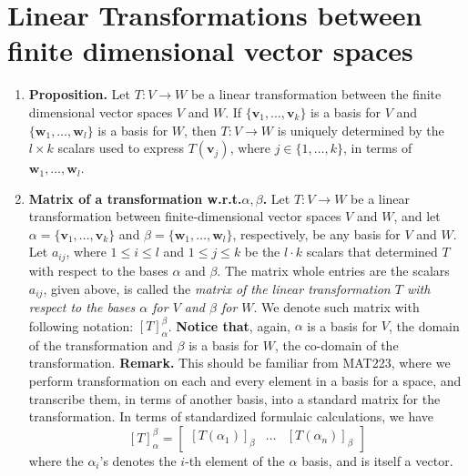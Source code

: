 \documentclass[oneside, 12pt]{book}
\newcommand{\settag}[1]{\renewcommand{\theenumi}{#1}}
\newcommand{\tbf}[1]{\textbf{#1}}
\newcommand{\tit}[1]{\textit{#1}}
\begin{document}
\section{Linear Transformations between finite dimensional vector spaces}
    \begin{enumerate}
        \settag{2.2.1}
        \item \tbf{Proposition.} Let $T:V\xrightarrow{}W$ be a linear transformation between the finite dimensional vector spaces $V$ and $W$. If $\{\mathbf{v}_1,\ldots,\mathbf{v}_k\}$ is a basis for $V$ and $\{\mathbf{w}_1,\ldots,\mathbf{w}_l\}$ is a basis for $W$, then $T:V\xrightarrow{}W$ is uniquely determined by the $l\times k$ scalars used to express $T(\mathbf{v}_j)$, where $j\in \{1,\ldots,k\}$, in terms of $\mathbf{w}_1,\ldots,\mathbf{w}_l$.
        
        \settag{2.2.6}
        \item \tbf{Matrix of a transformation w.r.t.$\alpha,\beta$.} Let $T:V\xrightarrow{}W$ be a linear transformation between finite-dimensional vector spaces $V$ and $W$, and let $\alpha = \{\mathbf{v}_1,\ldots,\mathbf{v}_k \}$ and $\beta = \{\mathbf{w}_1,\ldots,\mathbf{w}_l\}$, respectively, be any basis for $V$ and $W$. 
        Let $a_{ij}$, where $1\leq i \leq l$ and $1\leq j \leq k$ be the $l\cdot k$ scalars that determined $T$ with respect to the bases $\alpha$ and $\beta$. The matrix whole entries are the scalars $a_{ij}$, given above, is called the \tit{matrix of the linear transformation $T$ with respect to the bases $\alpha$ for $V$ and $\beta$ for $W$}. We denote such matrix with following notation: $\left[T\right]^\beta_\alpha$. \newline 
        \tbf{Notice that}, again, $\alpha$ is a basis for $V$, the domain of the transformation and $\beta$ is a basis for $W$, the co-domain of the transformation.
        \newline
        \tbf{Remark.} This should be familiar from MAT223, where we perform transformation on each and every element in a basis for a space, and transcribe them, in terms of another basis, into a standard matrix for the transformation. In terms of standardized formulaic calculations, we have
        \begin{equation*}
            \left[T\right]_\alpha^\beta =
            \begin{bmatrix}
                \left[T(\alpha_1) \right]_\beta & \ldots & \left[T(\alpha_n) \right]_\beta
            \end{bmatrix}
        \end{equation*}
        where the $\alpha_i$'s denotes the $i$-th element of the $\alpha$ basis, and is itself a vector.
        

\end{enumerate}
\end{document}

